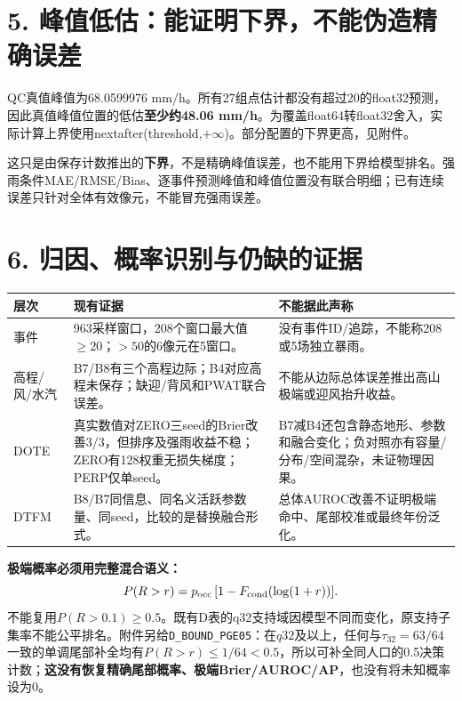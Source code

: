 \documentclass[UTF8,a4paper,10pt,fontset=none]{ctexart}
\begin{document}
\section*{5. 峰值低估：能证明下界，不能伪造精确误差}
QC真值峰值为68.0599976 mm/h。所有27组点估计都没有超过20的float32预测，因此真值峰值位置的低估\textbf{至少约48.06 mm/h}。为覆盖float64转float32舍入，实际计算上界使用nextafter(threshold,$+\infty$)。部分配置的下界更高，见附件。

这只是由保存计数推出的\textbf{下界}，不是精确峰值误差，也不能用下界给模型排名。强雨条件MAE/RMSE/Bias、逐事件预测峰值和峰值位置没有联合明细；已有连续误差只针对全体有效像元，不能冒充强雨误差。
\newpage
\section*{6. 归因、概率识别与仍缺的证据}
\begin{tabularx}{\linewidth}{@{}p{26mm}XX@{}}
\toprule
层次 & 现有证据 & 不能据此声称\\
\midrule
事件 & 963采样窗口，208个窗口最大值$\ge20$；$>50$的6像元在5窗口。 & 没有事件ID/追踪，不能称208或5场独立暴雨。\\
\addlinespace
高程/风/水汽 & B7/B8有三个高程边际；B4对应高程未保存；缺迎/背风和PWAT联合误差。 & 不能从边际总体误差推出高山极端或迎风抬升收益。\\
\addlinespace
DOTE & 真实数值对ZERO三seed的Brier改善3/3，但排序及强雨收益不稳；ZERO有128权重无损失梯度；PERP仅单seed。 & B7减B4还包含静态地形、参数和融合变化；负对照亦有容量/分布/空间混杂，未证物理因果。\\
\addlinespace
DTFM & B8/B7同信息、同名义活跃参数量、同seed，比较的是替换融合形式。 & 总体AUROC改善不证明极端命中、尾部校准或最终年份泛化。\\
\bottomrule
\end{tabularx}

\textbf{极端概率必须用完整混合语义：}
\[
P(R>r)=p_{\rm occ}\,[1-F_{\rm cond}(\log(1+r))].
\]
不能复用$P(R>0.1)\ge0.5$。既有D表的q32支持域因模型不同而变化，原支持子集率不能公平排名。附件另给\texttt{D\_BOUND\_PGE05}：在$q32$及以上，任何与$\tau_{32}=63/64$一致的单调尾部补全均有$P(R>r)\le1/64<0.5$，所以可补全同人口的0.5决策计数；\textbf{这没有恢复精确尾部概率、极端Brier/AUROC/AP}，也没有将未知概率设为0。
\end{document}
